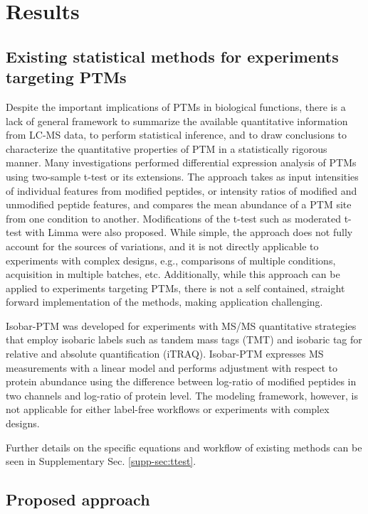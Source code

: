 \documentclass[mcp]{article}
\numberwithin{figure}{section} %
\numberwithin{table}{section}
\begin{document}
\section*{Results}

\subsection*{Existing statistical methods for experiments targeting PTMs}

Despite the important implications of PTMs in biological functions, there is a lack of general framework to summarize the available quantitative information from LC-MS data, to perform statistical inference, and to draw conclusions to characterize the quantitative properties of PTM in a statistically rigorous manner. Many investigations performed differential expression analysis of PTMs using two-sample t-test or its extensions. The approach takes as input intensities of individual features from modified peptides, or intensity ratios of modified and unmodified peptide features, and compares the mean abundance of a PTM site from one condition to another. Modifications of the t-test such as moderated t-test with Limma were also proposed\cite{Zhu}. While simple, the approach does not fully account for the sources of variations, and it is not directly applicable to experiments with complex designs, e.g., comparisons of multiple conditions, acquisition in multiple batches, etc. Additionally, while this approach can be applied to experiments targeting PTMs, there is not a self contained, straight forward implementation of the methods, making application challenging. 

Isobar-PTM was developed for experiments with MS/MS quantitative strategies that employ isobaric labels such as tandem mass tags (TMT) and isobaric tag for relative and absolute quantification (iTRAQ)\cite{Breitwieser:2013}. Isobar-PTM expresses MS measurements with a linear model and performs adjustment with respect to protein abundance using the difference between log-ratio of modified peptides in two channels and log-ratio of protein level. The modeling framework, however, is not applicable for either label-free workflows or experiments with complex designs. 

Further details on the specific equations and workflow of existing methods can be seen in Supplementary Sec. \ref{supp-sec:ttest}.

\subsection*{Proposed approach}
\end{document}
